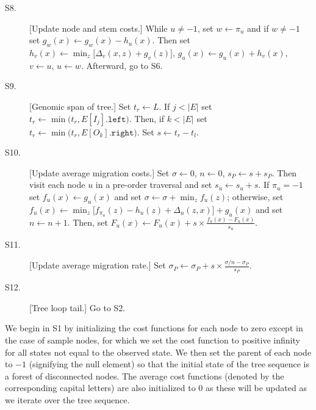 \begin{description}
\item[S8.] [Update node and stem costs.]
    While $u \neq -1$,
        set $w \leftarrow \pi_u$ and
        if $w \neq -1$
            set $g_w(x) \leftarrow g_w(x) - h_u(x)$.
        Then
        set $h_v(x) \leftarrow \min_{z}\bigl[\Delta_v(x,z) + g_v(z)\bigr]$,
        $g_u(x) \leftarrow g_u(x) + h_v(x)$,
        $v \leftarrow u$, $u \leftarrow w$.
    Afterward, go to S6.

\item[S9.] [Genomic span of tree.]
    Set $t_r \leftarrow L$.
    If $j < |E|$ set
        $t_r \leftarrow \min\bigl(t_r, E[I_j].\texttt{left}\bigr)$.
    Then,
    if $k < |E|$ set
        $t_r \leftarrow \min\bigl(t_r, E[O_k].\texttt{right}\bigr)$.
    Set $s \leftarrow t_r - t_l$.

\item[S10.] [Update average migration costs.]
    Set $\sigma \leftarrow 0$, $n \leftarrow 0$, $s_P \leftarrow s + s_P$.
    Then visit each node $u$ in a pre-order traversal and set
    $s_u \leftarrow s_u + s$.
    If $\pi_u = -1$ set
        $f_u(x) \leftarrow g_u(x)$ and set
        $\sigma \leftarrow \sigma + \min_z f_u(z)$;
    otherwise, set 
        $f_u(x) \leftarrow \min_z \bigl[ f_{\pi_u}(z) - h_u(z) + \Delta_u(z,x) \bigr] + g_u(x)$
        and set $n \leftarrow n + 1$.
    Then, set
        $F_u(x) \leftarrow F_u(x) + s \times \frac{f_u(x) - F_u(x)}{s_u}$.

\item[S11.] [Update average migration rate.]
    Set $\sigma_P \leftarrow \sigma_P + s \times \frac{\sigma/n - \sigma_P}{s_P}$.

\item[S12.] [Tree loop tail.]
    Go to S2.

\end{description}

We begin in S1 by initializing the cost functions for each node to zero except in
the case of sample nodes, for which we set the cost function to positive infinity for all states
not equal to the observed state. We then set the parent of each node to $-1$ 
(signifying the null element) so that the initial state of the tree sequence
is a forest of disconnected nodes. The average cost functions (denoted by the
corresponding capital letters) are also initialized to $0$ as these will be
updated as we iterate over the tree sequence.

